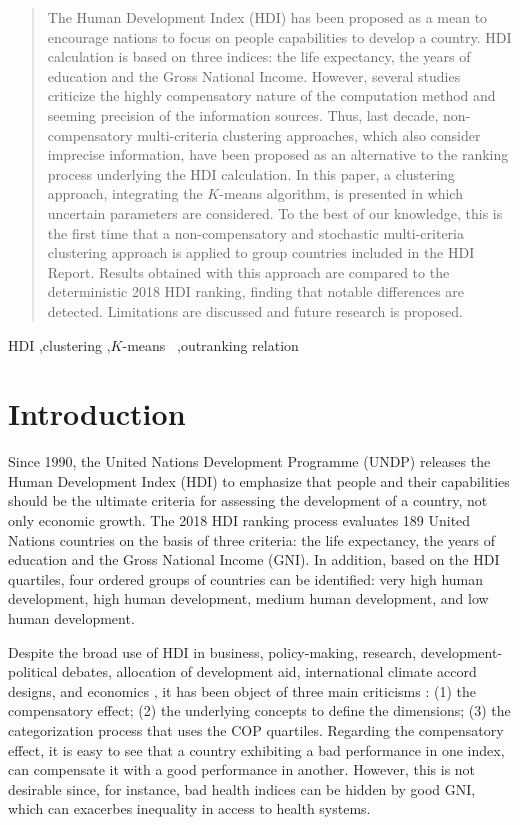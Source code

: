 \documentclass[]{elsarticle}
\theoremstyle{definition}
\begin{document}
\begin{frontmatter}
\begin{abstract}
The Human Development Index (HDI) has been proposed as a mean to encourage nations to focus on people capabilities to develop a country.  HDI calculation is based on three indices: the life expectancy, the years of education and the Gross National Income. However, several studies criticize the highly compensatory nature of the computation method and seeming precision of the information sources. Thus, last decade, non-compensatory multi-criteria clustering approaches, which also consider imprecise information,  have been proposed as an alternative to the ranking process underlying the HDI calculation. In this paper, a clustering approach, integrating  the $K$-means algorithm, is presented in which uncertain parameters are considered.  To the best of our knowledge, this is the first time that a non-compensatory and stochastic multi-criteria clustering approach is applied to group countries included in the HDI Report. Results obtained with this approach are compared to the deterministic 2018 HDI ranking, finding that notable differences are detected. Limitations are discussed and future research is proposed.
\end{abstract}

\begin{keyword}
HDI \sep clustering \sep $K$-means \ \sep outranking relation 
\end{keyword}

\end{frontmatter}


\section{Introduction}

Since 1990, the United Nations Development Programme (UNDP) releases the Human Development Index (HDI) to emphasize that people and their capabilities should be the ultimate criteria for assessing the development of a country, not only economic growth. The 2018 HDI ranking process evaluates  189 United Nations countries on the basis of three criteria: the life expectancy, the years of education and the Gross National Income (GNI). In addition, based on the HDI quartiles, four ordered groups of countries can be identified: very high human development, high human development, medium human development, and low human development.  

Despite the broad use of HDI  in business, policy-making, research, development-political debates, allocation of development aid, international climate accord designs, and economics \citep{Wolff2011}, it has been object of three main criticisms \citep{Noorbakhsh1998, Berenger2007, Klugman2011, Martinez2013}: (1) the compensatory effect; (2) the underlying concepts to define the dimensions; (3) the categorization process that uses the COP quartiles.  Regarding the compensatory effect, it is easy to see that a country exhibiting a bad performance in one index, can compensate it with a good performance in another. However, this is not desirable since, for instance, bad health indices can be hidden by good GNI, which can exacerbes inequality in access to health systems.   
\end{document}
